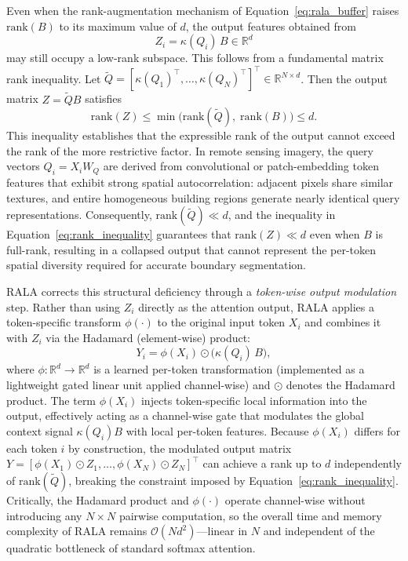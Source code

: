 Even when the rank-augmentation mechanism of Equation~\ref{eq:rala_buffer}
raises $\mathrm{rank}(B)$ to its maximum value of $d$, the output features
obtained from
\begin{equation}
Z_i = \kappa(Q_i)\, B \in \mathbb{R}^{d}
\label{eq:Z_pre_modulation}
\end{equation}
may still occupy a low-rank subspace. This follows from a fundamental matrix
rank inequality. Let $\tilde{Q} = [\kappa(Q_1)^\top, \ldots, \kappa(Q_N)^\top]^\top
\in \mathbb{R}^{N \times d}$. Then the output matrix
$Z = \tilde{Q} B$ satisfies
\begin{equation}
\mathrm{rank}(Z)
    \leq \min\!\bigl(\mathrm{rank}(\tilde{Q}),\; \mathrm{rank}(B)\bigr)
    \leq d.
\label{eq:rank_inequality}
\end{equation}
This inequality establishes that the expressible rank of the output cannot
exceed the rank of the more restrictive factor. In remote sensing imagery,
the query vectors $Q_i = X_i W_Q$ are derived from convolutional or
patch-embedding token features that exhibit strong spatial autocorrelation:
adjacent pixels share similar textures, and entire homogeneous building regions
generate nearly identical query representations. Consequently,
$\mathrm{rank}(\tilde{Q}) \ll d$, and the inequality in
Equation~\ref{eq:rank_inequality} guarantees that $\mathrm{rank}(Z) \ll d$
even when $B$ is full-rank, resulting in a collapsed output that cannot
represent the per-token spatial diversity required for accurate boundary
segmentation.

RALA corrects this structural deficiency through a \emph{token-wise output
modulation} step. Rather than using $Z_i$ directly as the attention output,
RALA applies a token-specific transform $\phi(\cdot)$ to the original input
token $X_i$ and combines it with $Z_i$ via the Hadamard (element-wise) product:
\begin{equation}
Y_i = \phi(X_i) \odot \bigl(\kappa(Q_i)\, B\bigr),
\label{eq:Yi_modulated}
\end{equation}
where $\phi: \mathbb{R}^{d} \to \mathbb{R}^{d}$ is a learned per-token
transformation (implemented as a lightweight gated linear unit applied
channel-wise) and $\odot$ denotes the Hadamard product. The term $\phi(X_i)$
injects token-specific local information into the output, effectively acting
as a channel-wise gate that modulates the global context signal $\kappa(Q_i) B$
with local per-token features. Because $\phi(X_i)$ differs for each token $i$
by construction, the modulated output matrix
$Y = [\phi(X_1) \odot Z_1, \ldots, \phi(X_N) \odot Z_N]^\top$ can achieve
a rank up to $d$ independently of $\mathrm{rank}(\tilde{Q})$, breaking the
constraint imposed by Equation~\ref{eq:rank_inequality}. Critically, the
Hadamard product and $\phi(\cdot)$ operate channel-wise without introducing
any $N \times N$ pairwise computation, so the overall time and memory
complexity of RALA remains $\mathcal{O}(N d^2)$---linear in $N$ and independent
of the quadratic bottleneck of standard softmax attention.

